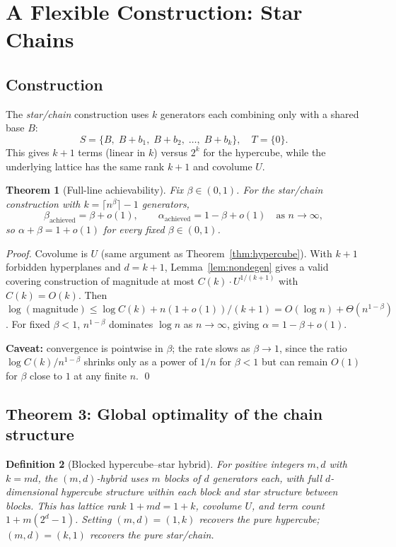 \documentclass[12pt]{article}
\newtheorem{theorem}{Theorem}[section]
\newtheorem{definition}[theorem]{Definition}
\theoremstyle{remark}
\begin{document}
\section{A Flexible Construction: Star Chains}
\label{sec:star}

\subsection{Construction}

The \emph{star/chain} construction uses $k$ generators each combining only with
a shared base $B$:
\[
  S = \{B,\; B + b_1,\; B + b_2,\; \ldots,\; B + b_k\}, \quad T = \{0\}.
\]
This gives $k+1$ terms (linear in $k$) versus $2^k$ for the hypercube, while
the underlying lattice has the same rank $k+1$ and covolume $U$.

\begin{theorem}[Full-line achievability]
\label{thm:fullline}
Fix $\beta \in (0,1)$.  For the star/chain construction with $k = \lceil n^\beta
\rceil - 1$ generators,
\[
  \beta_{\mathrm{achieved}} = \beta + o(1), \qquad
  \alpha_{\mathrm{achieved}} = 1 - \beta + o(1)
  \quad \text{as } n \to \infty,
\]
so $\alpha + \beta = 1 + o(1)$ for every fixed $\beta \in (0,1)$.
\end{theorem}

\begin{proof}
Covolume is $U$ (same argument as Theorem~\ref{thm:hypercube}).  With $k+1$
forbidden hyperplanes and $d = k+1$, Lemma~\ref{lem:nondegen} gives a valid
covering construction of magnitude at most $C(k) \cdot U^{1/(k+1)}$ with
$C(k) = O(k)$.  Then $\log(\mathrm{magnitude}) \le \log C(k) + n(1+o(1))/(k+1) =
O(\log n) + \Theta(n^{1-\beta})$.  For fixed $\beta < 1$, $n^{1-\beta}$
dominates $\log n$ as $n \to \infty$, giving $\alpha = 1 - \beta + o(1)$.

\textbf{Caveat:} convergence is pointwise in $\beta$; the rate slows as $\beta
\to 1$, since the ratio $\log C(k)/n^{1-\beta}$ shrinks only as a power of
$1/n$ for $\beta < 1$ but can remain $O(1)$ for $\beta$ close to $1$ at any
finite $n$.  \qed
\end{proof}

\subsection{Theorem 3: Global optimality of the chain structure}

\begin{definition}[Blocked hypercube--star hybrid]
For positive integers $m, d$ with $k = md$, the $(m,d)$-hybrid uses $m$ blocks
of $d$ generators each, with full $d$-dimensional hypercube structure
\emph{within} each block and star structure \emph{between} blocks.  This has
lattice rank $1 + md = 1 + k$, covolume $U$, and term count $1 + m(2^d - 1)$.
Setting $(m,d) = (1,k)$ recovers the pure hypercube; $(m,d) = (k,1)$ recovers
the pure star/chain.
\end{definition}
\end{document}
